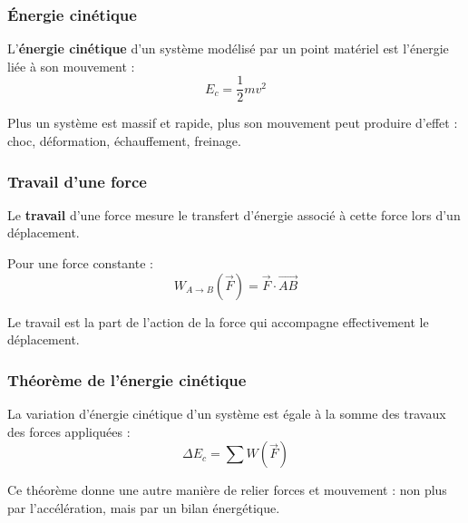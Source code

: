 \documentclass[11pt,a4paper]{article}
\begin{document}
\subsubsection{Énergie cinétique}

\begin{definitionbox}
L'\textbf{énergie cinétique} d'un système modélisé par un point matériel est l'énergie liée à son mouvement :
\[
E_c=\frac12 mv^2
\]
\end{definitionbox}

\begin{sensbox}
Plus un système est massif et rapide, plus son mouvement peut produire d'effet : choc, déformation, échauffement, freinage.
\end{sensbox}

\subsubsection{Travail d'une force}

\begin{definitionbox}
Le \textbf{travail} d'une force mesure le transfert d'énergie associé à cette force lors d'un déplacement.
\end{definitionbox}

\begin{proprbox}
Pour une force constante :
\[
W_{A\to B}(\vec F)=\vec F\cdot \overrightarrow{AB}
\]
\end{proprbox}

\begin{sensbox}
Le travail est la part de l'action de la force qui accompagne effectivement le déplacement.
\end{sensbox}

\subsubsection{Théorème de l'énergie cinétique}

\begin{proprbox}
La variation d'énergie cinétique d'un système est égale à la somme des travaux des forces appliquées :
\[
\Delta E_c=\sum W(\vec F)
\]
\end{proprbox}

\begin{sensbox}
Ce théorème donne une autre manière de relier forces et mouvement : non plus par l'accélération, mais par un bilan énergétique.
\end{sensbox}
\end{document}
